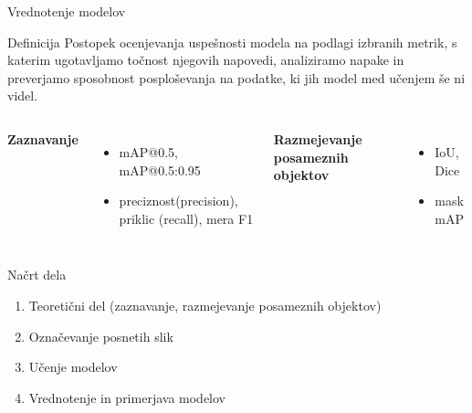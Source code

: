 \documentclass[aspectratio=169,11pt]{beamer}
\begin{document}
\begin{frame}{Vrednotenje modelov}
  \begin{block}{Definicija}
    Postopek ocenjevanja uspešnosti modela na podlagi izbranih metrik, s katerim ugotavljamo točnost njegovih napovedi, analiziramo napake in preverjamo sposobnost posploševanja na podatke, ki jih model med učenjem še ni videl.
  \end{block}
  \begin{columns}[T]
    \textbf{Zaznavanje}
    \begin{itemize}
      \item mAP@0.5, mAP@0.5:0.95
      \item preciznost(precision), priklic (recall), mera F1
    \end{itemize}
    \textbf{Razmejevanje posameznih objektov}
    \begin{itemize}
      \item IoU, Dice
      \item mask mAP
    \end{itemize}
  \end{columns}
  \vspace{0.5em}
\end{frame}
 
\begin{frame}{Načrt dela}
  \begin{enumerate}
    \item Teoretični del (zaznavanje, razmejevanje posameznih objektov)
    \item Označevanje posnetih slik
    \item Učenje modelov
    \item Vrednotenje in primerjava modelov
  \end{enumerate}
\end{frame}

\end{document}
